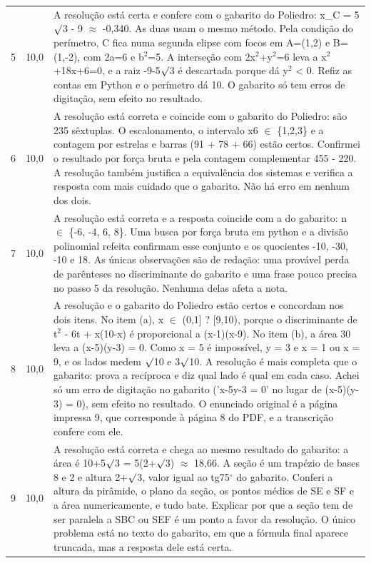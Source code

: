 \documentclass{article}%
\begin{document}
\begin{longtable}{@{}c c p{}@{}}
5 & 10,0 & A resolução está certa e confere com o gabarito do Poliedro: x\_C = 5$\surd$3 - 9 $\approx$ -0,340. As duas usam o mesmo método. Pela condição do perímetro, C fica numa segunda elipse com focos em A=(1,2) e B=(1,-2), com 2a=6 e b$^2$=5. A interseção com 2x$^2$+y$^2$=6 leva a x$^2$+18x+6=0, e a raiz -9-5$\surd$3 é descartada porque dá y$^2$ < 0. Refiz as contas em Python e o perímetro dá 10. O gabarito só tem erros de digitação, sem efeito no resultado. \\
6 & 10,0 & A resolução está correta e coincide com o gabarito do Poliedro: são 235 sêxtuplas. O escalonamento, o intervalo x6 $\in$ \{1,2,3\} e a contagem por estrelas e barras (91 + 78 + 66) estão certos. Confirmei o resultado por força bruta e pela contagem complementar 455 - 220. A resolução também justifica a equivalência dos sistemas e verifica a resposta com mais cuidado que o gabarito. Não há erro em nenhum dos dois. \\
7 & 10,0 & A resolução está correta e a resposta coincide com a do gabarito: n $\in$ \{-6, -4, 6, 8\}. Uma busca por força bruta em python e a divisão polinomial refeita confirmam esse conjunto e os quocientes -10, -30, -10 e 18. As únicas observações são de redação: uma provável perda de parênteses no discriminante do gabarito e uma frase pouco precisa no passo 5 da resolução. Nenhuma delas afeta a nota. \\
8 & 10,0 & A resolução e o gabarito do Poliedro estão certos e concordam nos dois itens. No item (a), x $\in$ (0,1{]} ? {[}9,10), porque o discriminante de t$^2$ - 6t + x(10-x) é proporcional a (x-1)(x-9). No item (b), a área 30 leva a (x-5)(y-3) = 0. Como x = 5 é impossível, y = 3 e x = 1 ou x = 9, e os lados medem $\surd$10 e 3$\surd$10. A resolução é mais completa que o gabarito: prova a recíproca e diz qual lado é qual em cada caso. Achei só um erro de digitação no gabarito ('x-5y-3 = 0' no lugar de (x-5)(y-3) = 0), sem efeito no resultado. O enunciado original é a página impressa 9, que corresponde à página 8 do PDF, e a transcrição confere com ele. \\
9 & 10,0 & A resolução está correta e chega ao mesmo resultado do gabarito: a área é 10+5$\surd$3 = 5(2+$\surd$3) $\approx$ 18,66. A seção é um trapézio de bases 8 e 2 e altura 2+$\surd$3, valor igual ao tg75$^\circ$ do gabarito. Conferi a altura da pirâmide, o plano da seção, os pontos médios de SE e SF e a área numericamente, e tudo bate. Explicar por que a seção tem de ser paralela a SBC ou SEF é um ponto a favor da resolução. O único problema está no texto do gabarito, em que a fórmula final aparece truncada, mas a resposta dele está certa. \\

\end{longtable}
\end{document}
